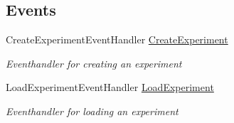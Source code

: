 \subsection*{Events}
\begin{DoxyCompactItemize}
\item 
Create\+Experiment\+Event\+Handler \hyperlink{class_web_analyzer_1_1_u_i_1_1_experiment_wizard_ac18185c9d12c074d2b82c2426e545461}{Create\+Experiment}
\begin{DoxyCompactList}\small\item\em Eventhandler for creating an experiment \end{DoxyCompactList}\item 
Load\+Experiment\+Event\+Handler \hyperlink{class_web_analyzer_1_1_u_i_1_1_experiment_wizard_ad469bc433ee12cf551309f1b2ab37e65}{Load\+Experiment}
\begin{DoxyCompactList}\small\item\em Eventhandler for loading an experiment \end{DoxyCompactList}\end{DoxyCompactItemize}
